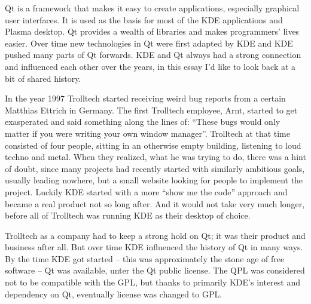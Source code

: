 

\noindent{}Qt is a framework that makes it easy to create applications, especially graphical user interfaces. It is used as the basis for most of the KDE applications and Plasma desktop. Qt provides a wealth of libraries and makes programmers' lives easier. Over time new technologies in Qt were first adapted by KDE and KDE pushed many parts of Qt forwards. KDE and Qt always had a strong connection and influenced each other over the years, in this essay I'd like to look back at a bit of shared history.

In the year 1997 Trolltech started receiving weird bug reports from a certain Matthias Ettrich in Germany. The first Trolltech employee, Arnt, started to get exasperated and said something along the lines of: “These bugs would only matter if you were writing your own window manager”. Trolltech at that time consisted of four people, sitting in an otherwise empty building, listening to loud techno and metal. When they realized, what he was trying to do, there was a hint of doubt, since many projects had recently started with similarly ambitious goals, usually leading nowhere, but a small website looking for people to implement the project. Luckily KDE started with a more “show me the code” approach and became a real product not so long after. And it would not take very much longer, before all of Trolltech was running KDE as their desktop of choice.

Trolltech as a company had to keep a strong hold on Qt; it was their product and business after all. But over time KDE influenced the history of Qt in many ways. By the time KDE got started – this was approximately the stone age of free software – Qt was available, unter the Qt public license. The QPL was considered not to be compatible with the GPL, but thanks to primarily KDE’s interest and dependency on Qt, eventually license was changed to GPL.

